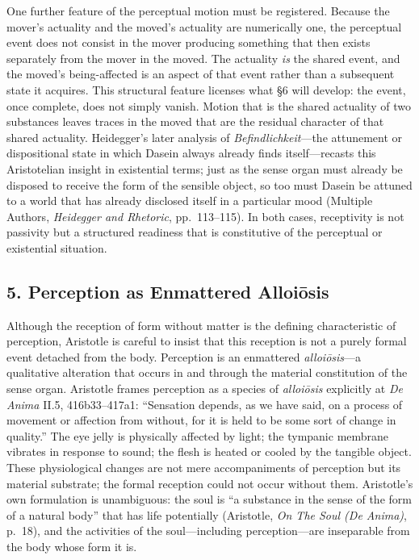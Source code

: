 \documentclass[12pt]{article}
\begin{document}
One further feature of the perceptual motion must be registered. Because the mover's actuality and the moved's actuality are numerically one, the perceptual event does not consist in the mover producing something that then exists separately from the mover in the moved. The actuality \textit{is} the shared event, and the moved's being-affected is an aspect of that event rather than a subsequent state it acquires. This structural feature licenses what §6 will develop: the event, once complete, does not simply vanish. Motion that is the shared actuality of two substances leaves traces in the moved that are the residual character of that shared actuality. Heidegger's later analysis of \textit{Befindlichkeit}---the attunement or dispositional state in which Dasein always already finds itself---recasts this Aristotelian insight in existential terms; just as the sense organ must already be disposed to receive the form of the sensible object, so too must Dasein be attuned to a world that has already disclosed itself in a particular mood (Multiple Authors, \textit{Heidegger and Rhetoric}, pp.~113--115). In both cases, receptivity is not passivity but a structured readiness that is constitutive of the perceptual or existential situation.

\subsection*{5. Perception as Enmattered Alloiōsis}

Although the reception of form without matter is the defining characteristic of perception, Aristotle is careful to insist that this reception is not a purely formal event detached from the body. Perception is an enmattered \textit{alloiōsis}---a qualitative alteration that occurs in and through the material constitution of the sense organ. Aristotle frames perception as a species of \textit{alloiōsis} explicitly at \textit{De Anima} II.5, 416b33--417a1: ``Sensation depends, as we have said, on a process of movement or affection from without, for it is held to be some sort of change in quality.'' The eye jelly is physically affected by light; the tympanic membrane vibrates in response to sound; the flesh is heated or cooled by the tangible object. These physiological changes are not mere accompaniments of perception but its material substrate; the formal reception could not occur without them. Aristotle's own formulation is unambiguous: the soul is ``a substance in the sense of the form of a natural body'' that has life potentially (Aristotle, \textit{On The Soul (De Anima)}, p.~18), and the activities of the soul---including perception---are inseparable from the body whose form it is.
\end{document}
